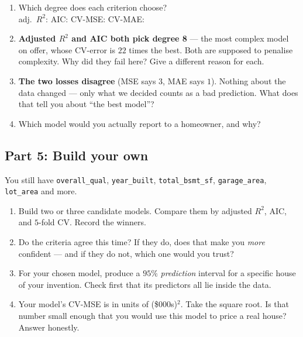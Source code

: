 \documentclass{article}
\newcommand{\blankline}[1]{\underline{\hspace{#1}}}
\begin{document}
\begin{enumerate}[label={\bfseries (\Alph*)},itemsep=.8em]
\item Which degree does each criterion choose? \\[0.4em]
adj.\ $R^2$: \blankline{0.7in} \quad AIC: \blankline{0.7in} \quad CV-MSE: \blankline{0.7in} \quad CV-MAE: \blankline{0.7in} \\[1em]
\item \textbf{Adjusted $R^2$ and AIC both pick degree 8} --- the most complex model on offer, whose CV-error is $22$ times the best. Both are supposed to penalise complexity. Why did they fail here? Give a different reason for each. \\[5em]
\item \textbf{The two losses disagree} (MSE says $3$, MAE says $1$). Nothing about the data changed --- only what we decided counts as a bad prediction. What does that tell you about ``the best model''? \\[4.5em]
\item Which model would you actually report to a homeowner, and why? \\[4em]
\end{enumerate}

\newpage

\subsection*{Part 5: Build your own}

You still have \texttt{overall\_qual}, \texttt{year\_built}, \texttt{total\_bsmt\_sf}, \texttt{garage\_area}, \texttt{lot\_area} and more.

\begin{enumerate}[label={\bfseries (\Alph*)},itemsep=.8em]
\item Build two or three candidate models. Compare them by adjusted $R^2$, AIC, and $5$-fold CV. Record the winners. \\[4.5em]
\item Do the criteria agree this time? If they do, does that make you \emph{more} confident --- and if they do not, which one would you trust? \\[4em]
\item For your chosen model, produce a $95\%$ \emph{prediction} interval for a specific house of your invention. Check first that its predictors all lie inside the data. \\[4.5em]
\item Your model's CV-MSE is in units of (\$000s)$^2$. Take the square root. Is that number small enough that you would use this model to price a real house? Answer honestly. \\[4em]
\end{enumerate}
\end{document}
